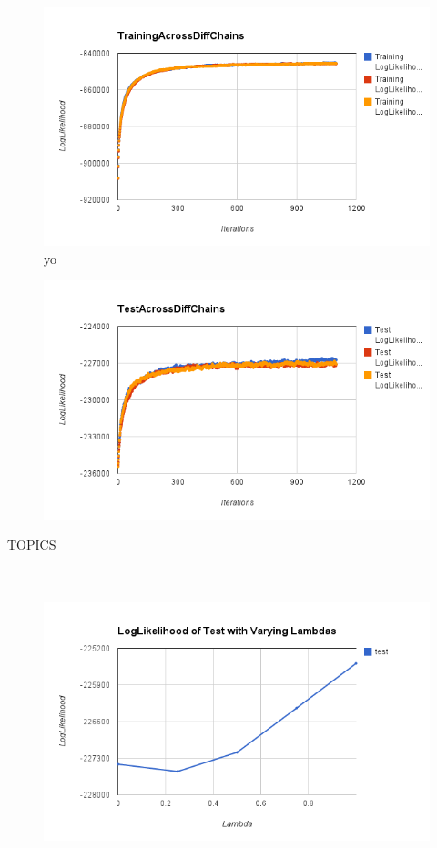 \documentclass[12pt]{article}
\begin{document}
\begin{figure}[H]
\centering
\includegraphics[keepaspectratio=true,scale=0.8]{charts/trainingLLOfChains}yo
\label{chainTraining}
\end{figure}

\begin{figure}[H]
\centering
\includegraphics[keepaspectratio=true,scale=0.8]{charts/testLLOfChains}
\label{chainTest}
\end{figure}

 TOPICS \\
\\
\\
\begin{figure}[H]
\centering
\includegraphics[keepaspectratio=true,scale=0.8]{charts/VaryingLambdaOnTest}
\label{lambdaVariation}
\end{figure}
\end{document}
